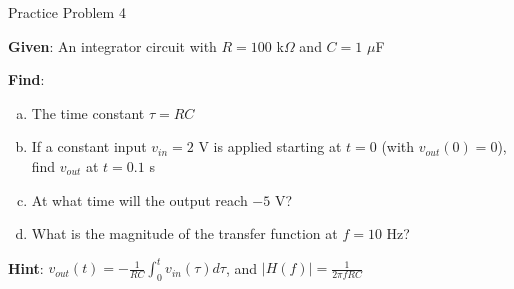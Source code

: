\documentclass[10pt, aspectratio=169]{beamer}
\newif\ifshowsolutions
\begin{document}
\begin{frame}{Practice Problem 4}
    
    \textbf{Given}: An integrator circuit with $R = 100$ k$\Omega$ and $C = 1$ $\mu$F
    
    \vspace{0.3cm}
    
    \textbf{Find}:
    \begin{enumerate}[(a)]
        \item The time constant $\tau = RC$
        \item If a constant input $v_{in} = 2$ V is applied starting at $t = 0$ (with $v_{out}(0) = 0$), find $v_{out}$ at $t = 0.1$ s
        \item At what time will the output reach $-5$ V?
        \item What is the magnitude of the transfer function at $f = 10$ Hz?
    \end{enumerate}
    
    \vspace{0.5cm}
    
    \textbf{Hint}: $v_{out}(t) = -\frac{1}{RC} \int_0^t v_{in}(\tau) d\tau$, and $|H(f)| = \frac{1}{2\pi f RC}$
    
\end{frame}

\ifshowsolutions
\begin{frame}{Practice Problem 4 Solution}
    
    \textbf{Given}: $R = 100$ k$\Omega$, $C = 1$ $\mu$F, $v_{in} = 2$ V (constant)
    
    \vspace{0.3cm}
    
    \textbf{Solutions}: 
    
    (a) Time constant:
    \[
    \tau = RC = (100 \times 10^3)(1 \times 10^{-6}) = \boxed{0.1 \text{ s}}
    \]
    
    (b) At $t = 0.1$ s:
    \[
    v_{out}(t) = -\frac{1}{RC} \int_0^t 2 \, d\tau = -\frac{2}{RC} \cdot t
    \]
    \[
    v_{out}(0.1) = -\frac{2}{0.1} \times 0.1 = \boxed{-2 \text{ V}}
    \]
    
    (c) For $v_{out} = -5$ V:
    \[
    -5 = -\frac{2}{0.1} \cdot t \Rightarrow t = \frac{5 \times 0.1}{2} = \boxed{0.25 \text{ s}}
    \]
    
    (d) At $f = 10$ Hz: 
    \[
    |H(f)| = \frac{1}{2\pi f RC} = \frac{1}{2\pi (10)(0.1)} = \frac{1}{2\pi} \approx \boxed{0.159}
    \]
    
\end{frame}
\fi
\end{document}
